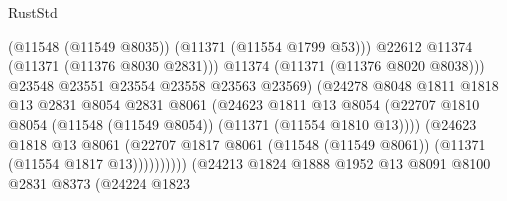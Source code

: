 \begin{lexlean}{RustStd}
\begin{coremodule}
                                                (@11548 (@11549 @8035))
                                                (@11371 (@11554 @1799 @53)))
                                              @22612
                                              @11374
                                              (@11371 (@11376 @8030 @2831)))
                                            @11374
                                            (@11371 (@11376 @8020 @8038)))
                                          @23548
                                          @23551
                                          @23554
                                          @23558
                                          @23563
                                          @23569)
                                        (@24278
                                          @8048
                                          @1811
                                          @1818
                                          @13
                                          @2831
                                          @8054
                                          @2831
                                          @8061
                                          (@24623
                                            @1811
                                            @13
                                            @8054
                                            (@22707
                                              @1810
                                              @8054
                                              (@11548 (@11549 @8054))
                                              (@11371 (@11554 @1810 @13))))
                                          (@24623
                                            @1818
                                            @13
                                            @8061
                                            (@22707
                                              @1817
                                              @8061
                                              (@11548 (@11549 @8061))
                                              (@11371 (@11554 @1817 @13))))))))))
                              (@24213
                                @1824
                                @1888
                                @1952
                                @13
                                @8091
                                @8100
                                @2831
                                @8373
                                (@24224
                                  @1823

\end{coremodule}
\end{lexlean}
